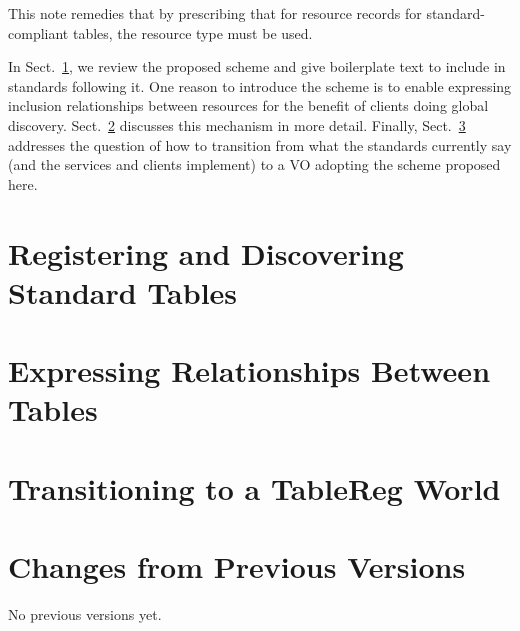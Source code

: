\documentclass[11pt,a4paper]{ivoa}
\begin{document}
This note remedies that by prescribing that for resource records for
standard-compliant tables, the resource type 
must be used.

In Sect.~\ref{sect:norms}, we review the proposed scheme and give
boilerplate text to include in standards following it.  One reason to
introduce the scheme is to enable expressing inclusion relationships
between resources for the benefit of clients doing global discovery.
Sect.~\ref{sect:rels} discusses this mechanism in more detail.  Finally,
Sect.~\ref{sect:transition} addresses the question of how to transition
from what the standards currently say (and the services and clients
implement) to a VO adopting the scheme proposed here.

\section{Registering and Discovering Standard Tables}
\label{sect:norms}

\section{Expressing Relationships Between Tables}
\label{sect:rels}

\section{Transitioning to a TableReg World}
\label{sect:transition}


\appendix
\section{Changes from Previous Versions}

No previous versions yet.



\end{document}
